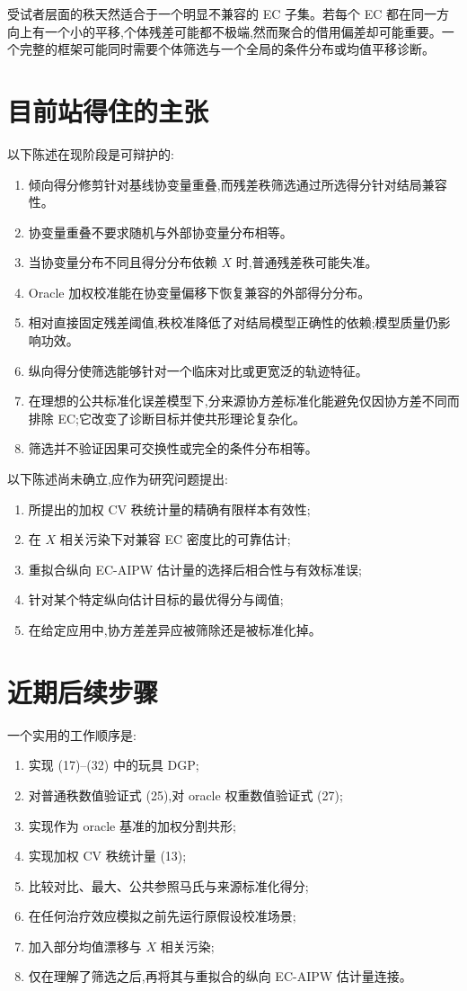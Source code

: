 \documentclass[11pt]{article}
\begin{document}
受试者层面的秩天然适合于一个明显不兼容的 EC 子集。若每个 EC 都在同一方向上有一个小的平移,个体残差可能都不极端,然而聚合的借用偏差却可能重要。一个完整的框架可能同时需要个体筛选与一个全局的条件分布或均值平移诊断。

\section{目前站得住的主张}

以下陈述在现阶段是可辩护的:
\begin{enumerate}
    \item 倾向得分修剪针对基线协变量重叠,而残差秩筛选通过所选得分针对结局兼容性。
    \item 协变量重叠不要求随机与外部协变量分布相等。
    \item 当协变量分布不同且得分分布依赖 $X$ 时,普通残差秩可能失准。
    \item Oracle 加权校准能在协变量偏移下恢复兼容的外部得分分布。
    \item 相对直接固定残差阈值,秩校准降低了对结局模型正确性的依赖;模型质量仍影响功效。
    \item 纵向得分使筛选能够针对一个临床对比或更宽泛的轨迹特征。
    \item 在理想的公共标准化误差模型下,分来源协方差标准化能避免仅因协方差不同而排除 EC;它改变了诊断目标并使共形理论复杂化。
    \item 筛选并不验证因果可交换性或完全的条件分布相等。
\end{enumerate}

以下陈述尚未确立,应作为研究问题提出:
\begin{enumerate}
    \item 所提出的加权 CV 秩统计量的精确有限样本有效性;
    \item 在 $X$ 相关污染下对兼容 EC 密度比的可靠估计;
    \item 重拟合纵向 EC-AIPW 估计量的选择后相合性与有效标准误;
    \item 针对某个特定纵向估计目标的最优得分与阈值;
    \item 在给定应用中,协方差差异应被筛除还是被标准化掉。
\end{enumerate}

\section{近期后续步骤}

一个实用的工作顺序是:
\begin{enumerate}
    \item 实现 (17)--(32) 中的玩具 DGP;
    \item 对普通秩数值验证式 (25),对 oracle 权重数值验证式 (27);
    \item 实现作为 oracle 基准的加权分割共形;
    \item 实现加权 CV 秩统计量 (13);
    \item 比较对比、最大、公共参照马氏与来源标准化得分;
    \item 在任何治疗效应模拟之前先运行原假设校准场景;
    \item 加入部分均值漂移与 $X$ 相关污染;
    \item 仅在理解了筛选之后,再将其与重拟合的纵向 EC-AIPW 估计量连接。
\end{enumerate}
\end{document}
